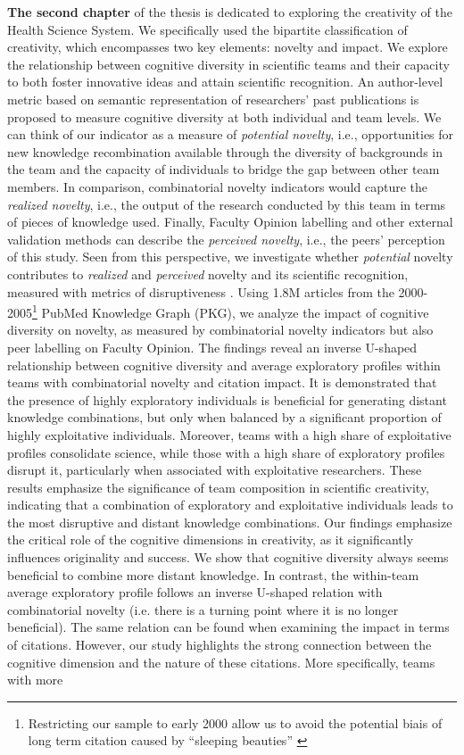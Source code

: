 \textbf{The second chapter} of the thesis is dedicated to exploring the creativity of the Health Science System. We specifically used the bipartite classification of creativity, which encompasses two key elements: novelty and impact\cite{runco2012standard}. We explore the relationship between cognitive diversity in scientific teams and their capacity to both foster innovative ideas and attain scientific recognition. An author-level metric based on semantic representation of researchers' past publications is proposed to measure cognitive diversity at both individual and team levels. We can think of our indicator as a measure of \textit{potential novelty}, i.e., opportunities for new knowledge recombination available through the diversity of backgrounds in the team and the capacity of individuals to bridge the gap between other team members. In comparison, combinatorial novelty indicators would capture the \textit{realized novelty}, i.e., the output of the research conducted by this team in terms of pieces of knowledge used. Finally, Faculty Opinion labelling and other external validation methods can describe the \textit{perceived novelty}, i.e., the peers' perception of this study. Seen from this perspective, we investigate whether \textit{potential} novelty contributes to \textit{realized} and \textit{perceived} novelty and its scientific recognition, measured with metrics of disruptiveness \citep{wu2019large,bornmann1911disruption,bu2019multi}. Using 1.8M articles from the 2000-2005\footnote{Restricting our sample to early 2000 allow us to avoid the potential biais of long term citation caused by ``sleeping beauties'' \citep{lin2021novelty}} PubMed Knowledge Graph (PKG), we analyze the impact of cognitive diversity on novelty, as measured by combinatorial novelty indicators but also peer labelling on Faculty Opinion. The findings reveal an inverse U-shaped relationship between cognitive diversity and average exploratory profiles within teams with combinatorial novelty and citation impact. It is demonstrated that the presence of highly exploratory individuals is beneficial for generating distant knowledge combinations, but only when balanced by a significant proportion of highly exploitative individuals. Moreover, teams with a high share of exploitative profiles consolidate science, while those with a high share of exploratory profiles disrupt it, particularly when associated with exploitative researchers. These results emphasize the significance of team composition in scientific creativity, indicating that a combination of exploratory and exploitative individuals leads to the most disruptive and distant knowledge combinations. Our findings emphasize the critical role of the cognitive dimensions in creativity, as it significantly influences originality and success. We show that cognitive diversity always seems beneficial to combine more distant knowledge. In contrast, the within-team average exploratory profile follows an inverse U-shaped relation with combinatorial novelty (i.e. there is a turning point where it is no longer beneficial). The same relation can be found when examining the impact in terms of citations. However, our study highlights the strong connection between the cognitive dimension and the nature of these citations. More specifically, teams with more 
